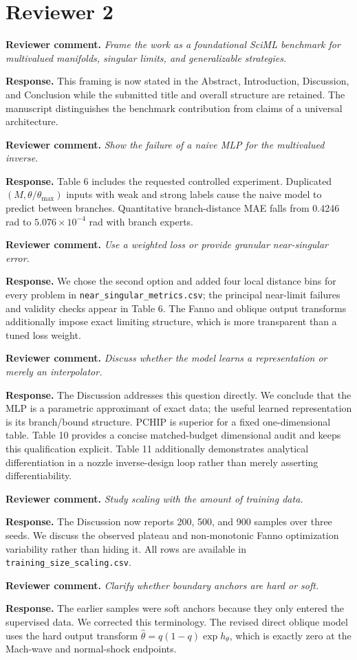 \documentclass[11pt]{article}
\newcommand{\comment}[1]{\par\medskip\noindent\textbf{Reviewer comment.} \emph{#1}\par}
\newcommand{\response}[1]{\par\noindent\textcolor{responseblue}{\textbf{Response.} #1}\par\medskip}
\begin{document}
\section*{Reviewer 2}

\comment{Frame the work as a foundational SciML benchmark for multivalued manifolds, singular limits, and generalizable strategies.}
\response{This framing is now stated in the Abstract, Introduction, Discussion, and Conclusion while the submitted title and overall structure are retained. The manuscript distinguishes the benchmark contribution from claims of a universal architecture.}

\comment{Show the failure of a naive MLP for the multivalued inverse.}
\response{Table 6 includes the requested controlled experiment. Duplicated $(M,\theta/\theta_{\max})$ inputs with weak and strong labels cause the naive model to predict between branches. Quantitative branch-distance MAE falls from 0.4246 rad to $5.076\times10^{-4}$ rad with branch experts.}

\comment{Use a weighted loss or provide granular near-singular error.}
\response{We chose the second option and added four local distance bins for every problem in \texttt{near\_singular\_metrics.csv}; the principal near-limit failures and validity checks appear in Table 6. The Fanno and oblique output transforms additionally impose exact limiting structure, which is more transparent than a tuned loss weight.}

\comment{Discuss whether the model learns a representation or merely an interpolator.}
\response{The Discussion addresses this question directly. We conclude that the MLP is a parametric approximant of exact data; the useful learned representation is its branch/bound structure. PCHIP is superior for a fixed one-dimensional table. Table 10 provides a concise matched-budget dimensional audit and keeps this qualification explicit. Table 11 additionally demonstrates analytical differentiation in a nozzle inverse-design loop rather than merely asserting differentiability.}

\comment{Study scaling with the amount of training data.}
\response{The Discussion now reports 200, 500, and 900 samples over three seeds. We discuss the observed plateau and non-monotonic Fanno optimization variability rather than hiding it. All rows are available in \texttt{training\_size\_scaling.csv}.}

\comment{Clarify whether boundary anchors are hard or soft.}
\response{The earlier samples were soft anchors because they only entered the supervised data. We corrected this terminology. The revised direct oblique model uses the hard output transform $\widehat\theta=q(1-q)\exp h_\theta$, which is exactly zero at the Mach-wave and normal-shock endpoints.}
\end{document}
